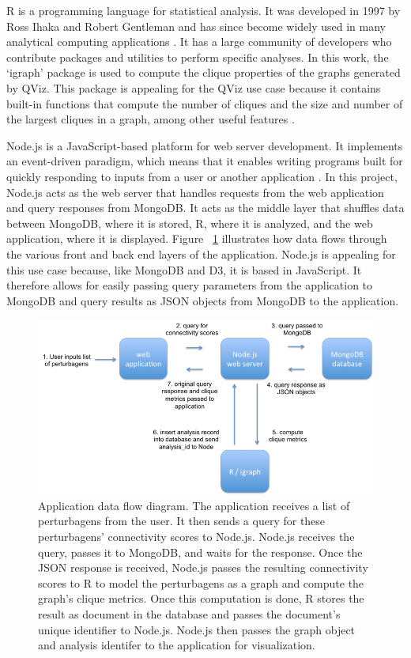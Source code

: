 \documentclass[12pt]{article}
\begin{document}
R is a programming language for statistical analysis. It was developed in 1997 by Ross Ihaka and Robert Gentleman and has since become widely used in many analytical computing applications \cite{r_lang}. It has a large community of developers who contribute packages and utilities to perform specific analyses. In this work, the `igraph' package is used to compute the clique properties of the graphs generated by QViz. This package is appealing for the QViz use case because it contains built-in functions that compute the number of cliques and the size and number of the largest cliques in a graph, among other useful features \cite{igraph}.

Node.js is a JavaScript-based platform for web server development. It implements an event-driven paradigm, which means that it enables writing programs built for quickly responding to inputs from a user or another application \cite{node}. In this project, Node.js acts as the web server that handles requests from the web application and query responses from MongoDB. It acts as the middle layer that shuffles data between MongoDB, where it is stored, R, where it is analyzed, and the web application, where it is displayed. Figure ~\ref{fig:app_data_flow} illustrates how data flows through the various front and back end layers of the application. Node.js is appealing for this use case because, like MongoDB and D3, it is based in JavaScript. It therefore allows for easily passing query parameters from the application to MongoDB and query results as JSON objects from MongoDB to the application.


\begin{figure}[h]
\centering
\includegraphics[scale=0.5]{img/app_data_flow_small.png}
\caption{ Application data flow diagram. The application receives a list of perturbagens from the user. It then sends a query for these perturbagens' connectivity scores to Node.js. Node.js receives the query, passes it to MongoDB, and waits for the response. Once the JSON response is received, Node.js passes the resulting connectivity scores to R to model the perturbagens as a graph and compute the graph's clique metrics. Once this computation is done, R stores the result as document in the database and passes the document's unique identifier to Node.js. Node.js then passes the graph object and analysis identifer to the application for visualization.}
\label{fig:app_data_flow}
\end{figure}
\end{document}
